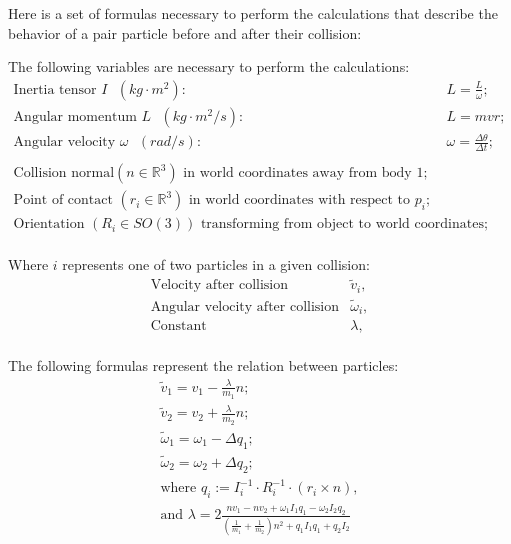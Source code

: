 \documentclass[a4paper,12pt]{article}
\begin{document}
Here is a set of formulas necessary to perform the calculations that describe
the behavior of a pair particle before and after their collision:

The following variables are necessary to perform the calculations:
\[
\begin{array}{ll}
    \text{Inertia tensor $I$ } (kg\cdot m^2): & L = \frac{L}{\omega}; \\
    \text{Angular momentum $L$ } (kg\cdot m^2/s): & L = mvr; \\
    \text{Angular velocity $\omega$ } (rad/s): & \omega = \frac{\Delta \theta}{\Delta t}; \\

	\\

	\text{Collision normal} (n \in \mathbb{R}^3) \text{ in world coordinates away from body 1}; \\
	\text{Point of contact } (r_i \in \mathbb{R}^3) \text{ in world coordinates with respect to $p_i$}; \\
	\text{Orientation } (R_i \in SO(3)) \text{ transforming from object to world coordinates}; \\
\end{array}
\]

Where $i$ represents one of two particles in a given collision:
\[
\begin{array}{ll}
	\text{Velocity after collision} & \tilde{v}_i, \\ 
	\text{Angular velocity after collision} & \tilde{\omega}_i, \\
	\text{Constant} & \lambda, \\
\end{array}
\]

The following formulas represent the relation between particles:
\[
\begin{array}{cc}
	\tilde{v}_1 = v_1 - \frac{\lambda}{m_1} n; \\ 
	\tilde{v}_2 = v_2 + \frac{\lambda}{m_2} n; \\
	\tilde{\omega}_1 = \omega_1 - \Delta q_1; \\
	\tilde{\omega}_2 = \omega_2 + \Delta q_2; \\

	\text{where } q_i := I_i^{-1} \cdot R_i^{-1} \cdot (r_i\times n), \\
	\text{and } \lambda = 2 \frac{n v_1 - n v_2 + \omega_1 I_1 q_1 - \omega_2 I_2 q_2}
	{(\frac{1}{m_1} + \frac{1}{m_2})n^2 + q_1 I_1 q_1 + q_2 I_2} \\
\end{array}
\]
\end{document}
